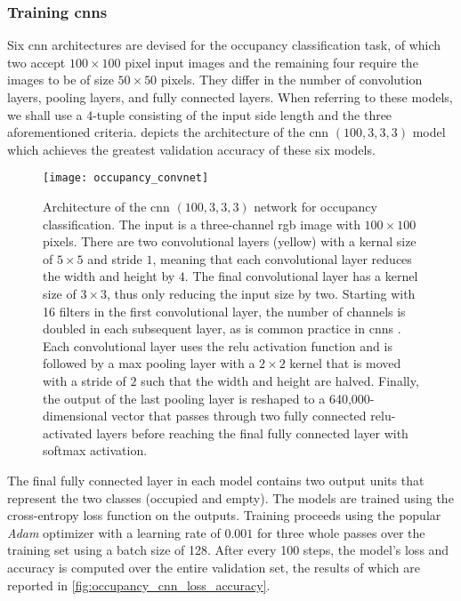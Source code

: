 \documentclass[../main.tex]{subfiles}
\begin{document}
\subsubsection{Training \glspl{cnn}}
Six \gls{cnn} architectures are devised for the occupancy classification task, of which two accept $100\times 100$ pixel input images and the remaining four require the images to be of size $50\times 50$ pixels.
They differ in the number of convolution layers, pooling layers, and fully connected layers.
When referring to these models, we shall use a 4-tuple consisting of the input side length and the three aforementioned criteria.
 depicts the architecture of the \gls{cnn} $(100, 3, 3, 3)$ model which achieves the greatest validation accuracy of these six models.
\begin{figure}
    \centering
    \texttt{[image: occupancy\_convnet]}
    \caption[Architecture of the CNN $(100,3,3,3)$ network for occupancy classification.]{
        Architecture of the \gls{cnn} $(100,3,3,3)$ network for occupancy classification.
        The input is a three-channel \gls{rgb} image with $100\times 100$ pixels.
        There are two convolutional layers (yellow) with a kernal size of $5 \times 5$ and stride $1$, meaning that each convolutional layer reduces the width and height by $4$.
        The final convolutional layer has a kernel size of $3 \times 3$, thus only reducing the input size by two.
        Starting with 16 filters in the first convolutional layer, the number of channels is doubled in each subsequent layer, as is common practice in \glspl{cnn} \cite{simonyan2015}.
        Each convolutional layer uses the \gls{relu} activation function and is followed by a max pooling layer with a $2\times 2$ kernel that is moved with a stride of $2$ such that the width and height are halved.
        Finally, the output of the last pooling layer is reshaped to a 640,000-dimensional vector that passes through two fully connected \gls{relu}-activated layers before reaching the final fully connected layer with softmax activation.
    }
    \label{fig:occupancy_convnet}
\end{figure}
The final fully connected layer in each model contains two output units that represent the two classes (occupied and empty).
The models are trained using the cross-entropy loss function on the outputs.
Training proceeds using the popular \emph{Adam} optimizer \cite{kingma2017} with a learning rate of $0.001$ for three whole passes over the training set using a batch size of 128.
After every 100 steps, the model's loss and accuracy is computed over the entire validation set, the results of which are reported in \cref{fig:occupancy_cnn_loss_accuracy}.
\end{document}
